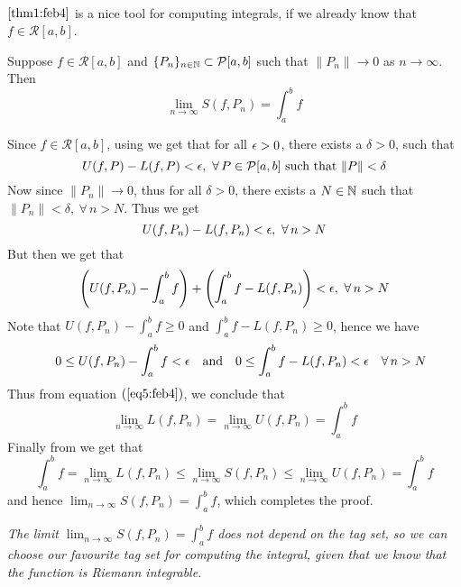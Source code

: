 \ 

 $\ref{thm1:feb4}$ is a nice tool for computing integrals, if we already know that $f \in \mathcal{R}[a,b]$.

\begin{thm}\label{thm2:feb4}
    Suppose $f \in \mathcal{R}[a,b]$ and $\{P_n\}_{n\in\mathbb{N}} \subset \mathcal{P}[a,b]$ such that $\| P_n \| \to 0$ as $n \to \infty$. Then 
    \[ 
        \lim_{n \to \infty} S(f,P_n) = \int_a^b f    
    \]
\end{thm}
\begin{prf}
    Since $f \in \mathcal{R}[a,b]$, using  we get that for all $\epsilon > 0$, there exists a $\delta > 0$, such that 
    \[
        U(f,P) - L(f,P) < \eps, \ \forall \, P \in \mathcal{P}[a,b] \mbox{ such that } \|P\| < \delta  
    \]
    Now since $\|P_n\| \to 0$, thus for all $\delta > 0$, there exists a $N \in \mathbb{N}$ such that $\|P_n\| < \delta, \ \forall \, n > N$. Thus we get 
    \[ 
        U(f, P_n) - L(f, P_n) < \epsilon, \ \forall \, n > N    
    \]
    But then we get that 
    \[ 
        \left( U(f,P_n) - \int_a^b f \right) + \left( \int_a^b f - L(f,P_n) \right) < \epsilon, \ \forall \, n > N    
    \]
    Note that $U(f,P_n) - \int_a^b f \geq 0$ and $\int_a^b f - L(f,P_n) \geq 0$, hence we have 
    \begin{align}\label{eq5:feb4}
        &&0 \leq U(f,P_n)-\int_a^b f < \epsilon &&\mbox{and} &&0 \leq \int_a^b f - L(f,P_n) < \epsilon &&\forall \, n > N
    \end{align}
    Thus from equation $(\ref{eq5:feb4})$, we conclude that 
    \[
        \lim_{n\to\infty} L(f,P_n) = \lim_{n\to\infty} U(f,P_n) = \int_a^b f  
    \]
    Finally from  we get that 
    \[
        \int_a^b f = \lim_{n\to\infty} L(f,P_n) \leq \lim_{n\to\infty}S(f,P_n) \leq \lim_{n\to\infty} U(f,P_n) = \int_a^b f  
    \]
    and hence $\lim_{n\to\infty} S(f,P_n) = \int_a^b f$, which completes the proof.
\end{prf}

\begin{exampleBox}
     \textit{The limit $\lim_{n\to\infty} S(f,P_n) = \int_a^b f$ does not depend on the tag set, so we can choose our favourite tag set for computing the integral, given that we know that the function is Riemann integrable.}
\end{exampleBox}

